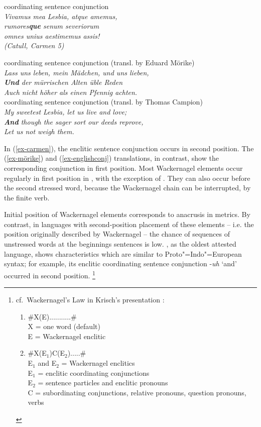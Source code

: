 \documentclass[output=paper
  ,nobabel
  ,uniformtopskip %
]{langscibook}
\begin{document}
\eal\label{ex-wackernagelslaw}
\ex\label{ex-carmen}
  coordinating sentence conjunction\\
\textit{Vivamus mea Lesbia, atque amemus,\\
 rumores\textbf{que} senum severiorum\\
omnes unius aestimemus assis!\\
\textup{(Catull,} Carmen 5)\\} 

\ex\label{ex-mörike}
 coordinating sentence conjunction (transl. by Eduard Mörike)\\
\textit{Lass uns leben, mein Mädchen, und uns lieben,\\
\textbf{Und} der mürrischen Alten üble Reden\\
 Auch nicht höher als einen Pfennig achten.\\}
\ex\label{ex-englishconj}
 coordinating sentence conjunction (transl. by Thomas Campion)\\
\textit{My sweetest Lesbia, let us live and love;\\
 \textbf{And} though the sager sort our deeds reprove,\\
 Let us not weigh them. \\}
\zl

\noindent
In (\ref{ex-carmen}), the enclitic  sentence conjunction occurs in second position. The 
(\ref{ex-mörike}) and  (\ref{ex-englishconj}) translations, in contrast, show the
corresponding conjunction in first position. Most Wackernagel elements occur regularly in first
position in , with the exception of . They can also occur before the second stressed
word, because the Wackernagel chain can be interrupted, \eg by the finite verb. 

Initial position of Wackernagel elements corresponds to anacrusis in  metrics. By contrast, in languages with second-position placement of these elements – i.e. the position originally described by Wackernagel – the chance of sequences of unstressed words at the beginnings sentences is low. , as the oldest attested  language, shows characteristics which are similar to Proto"=Indo"=European syntax; for example, its enclitic coordinating sentence conjunction -\textit{uh} `and' occurred in second position.%
%
\footnote{cf.\ Wackernagel's Law in Krisch's presentation \citep[283--284]{Krisch1997}:
\begin{enumerate}
	\item \#X(E)...........\#  \\ X = one word (default)\\ 
	E = Wackernagel enclitic  
\item \#X(E$_1$)C(E$_2$).....\#  \\ 
      E$_1$ and E$_2$ = Wackernagel enclitics \\ 
      E$_1$ = enclitic coordinating conjunctions \\       
      E$_2$ = sentence particles and enclitic pronouns \\ 
      C = subordinating conjunctions, relative pronouns, question pronouns, verbs
\end{enumerate} 
}
\end{document}
